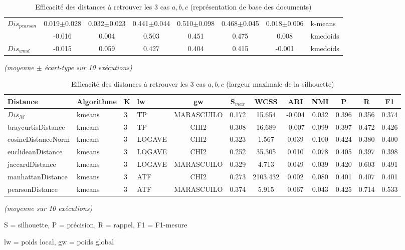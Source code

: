 \begin{table}[!htb]
\begin{tabular}{|l||c|c||c|c|c||c||l|}
		\multirow{2}{*}{$Dis_{pearson}$} & 0.019$\pm$0.028 & 0.032$\pm$0.023 & 0.441$\pm$0.044 & 0.510$\pm$0.098 & 0.468$\pm$0.045 & 0.018$\pm$0.006 & k-means \\
		 & -0.016 & 0.004 & 0.503 & 0.451 & 0.475 & 0.008 & kmedoids \\ \hline
		
		
		$Dis_{wmd}$   & -0.015 & 0.059 & 0.427 & 0.404 & 0.415 & -0.001 & kmedoids \\ \hline
		
	\end{tabular}

	\textit{(moyenne $\pm$ écart-type sur 10 exécutions)}
	\caption{Efficacité des distances à retrouver les 3 cas $a,b,c$ (représentation de base des documents)}\label{tab:similarite:compare-dist-tfidf}
\end{table}

\begin{table}[!htb]
	\scriptsize
	\begin{center}		
	\begin{tabular}{|l|l|l|l|c|c|c|c|c|c|c|c|}%
		\hline
		Distance & Algorithme& K& lw& gw& S$_{max}$ & WCSS & ARI& NMI& P& R& F1 \\ \hline
		$Dis_\mathcal{M}$ & kmeans & 3 & TP & MARASCUILO & 0.172 & 15.654 & -0.004 & 0.032 & 0.396 & 0.356 & 0.374 \\ \hline
		braycurtisDistance & kmeans & 3 & TP & CHI2 & 0.308 & 16.689 & -0.007 & 0.099 & 0.397 & 0.472 & 0.426 \\ \hline
		cosineDistanceNorm & kmeans & 3 & LOGAVE & CHI2 & 0.323 & 1.567 & 0.039 & 0.100 & 0.424 & 0.380 & 0.400 \\ \hline
		euclideanDistance & kmeans & 3 & LOGAVE & CHI2 & 0.252 & 35.305 & 0.010 & 0.078 & 0.405 & 0.397 & 0.398 \\ \hline
		jaccardDistance & kmeans & 3 & LOGAVE & MARASCUILO & 0.329 & 4.713 & 0.049 & 0.039 & 0.420 & 0.603 & 0.491 \\ \hline
		manhattanDistance & kmeans & 3 & ATF & CHI2 & 0.273 & 2103.432 & 0.002 & 0.080 & 0.401 & 0.407 & 0.401 \\ \hline
		pearsonDistance & kmeans & 3 & ATF & MARASCUILO & 0.374 & 5.915 & 0.067 & 0.043 & 0.425 & 0.714 & 0.533 \\ \hline
	\end{tabular}

	\textit{(moyenne sur 10 exécutions)}
\end{center}
	
	S = silhouette, P = précision, R = rappel, F1 = F1-mesure
	
	lw = poids local, gw = poids global

	\caption{Efficacité des distances à retrouver les 3 cas $a,b,c$ (largeur maximale de la silhouette)}\label{tab:similarite:compare-dist-silhouette}
\end{table}


